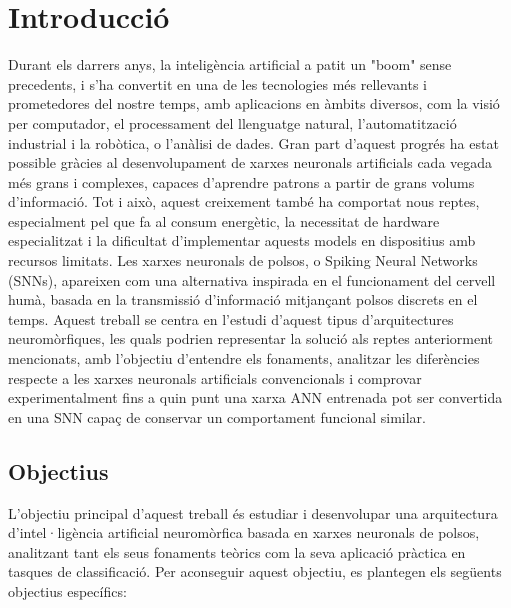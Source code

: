 \documentclass[a4paper,11pt, titlepage, twoside]{article}
\begin{document}
\section{Introducció}\label{introducció}
Durant els darrers anys, la inteligència artificial a patit un "boom" sense precedents, i s'ha convertit en una de les tecnologies més rellevants i prometedores del nostre temps, amb aplicacions en àmbits diversos, com la visió per computador, el processament del llenguatge natural, l'automatització industrial i la robòtica, o l'anàlisi de dades. Gran part d’aquest progrés ha estat possible gràcies al desenvolupament de xarxes neuronals artificials cada vegada més grans i complexes, capaces d’aprendre patrons a partir de grans volums d’informació. Tot i això, aquest creixement també ha comportat nous reptes, especialment pel que fa al consum energètic, la necessitat de hardware especialitzat i la dificultat d’implementar aquests models en dispositius amb recursos limitats. Les xarxes neuronals de polsos, o Spiking Neural Networks (SNNs), apareixen com una alternativa inspirada en el funcionament del cervell humà, basada en la transmissió d’informació mitjançant polsos discrets en el temps. Aquest treball se centra en l’estudi d’aquest tipus d’arquitectures neuromòrfiques, les quals podrien representar la solució als reptes anteriorment mencionats, amb l’objectiu d’entendre els fonaments, analitzar les diferències respecte a les xarxes neuronals artificials convencionals i comprovar experimentalment fins a quin punt una xarxa ANN entrenada pot ser convertida en una SNN capaç de conservar un comportament funcional similar.

\subsection{Objectius}
L’objectiu principal d’aquest treball és estudiar i desenvolupar una arquitectura d’intel·ligència artificial neuromòrfica basada en xarxes neuronals de polsos, analitzant tant els seus fonaments teòrics com la seva aplicació pràctica en tasques de classificació. Per aconseguir aquest objectiu, es plantegen els següents objectius específics:
\end{document}
